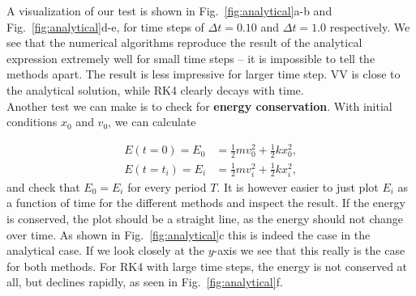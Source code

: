 \documentclass{article}
\begin{document}
\begin{multicols}{2}
A visualization of our test is shown in Fig.~\ref{fig:analytical}a-b and Fig.~\ref{fig:analytical}d-e, for time steps of $\Delta t = 0.10$ and $\Delta t = 1.0$ respectively. We see that the numerical algorithms reproduce the result of the analytical expression extremely well for small time steps -- it is impossible to tell the methods apart. The result is less impressive for larger time step. VV is close to the analytical solution, while RK4 clearly decays with time. \\

\noindent Another test we can make is to check for \textbf{energy conservation}. With initial conditions $x_0$ and $v_0$, we can calculate

\begin{equation}
	\begin{aligned}
		E(t = 0) = E_0 &= \frac{1}{2}mv_0^2 + \frac{1}{2}kx_0^2, \\
		E(t = t_i) = E_i &= \frac{1}{2}mv_i^2 + \frac{1}{2}kx_i^2,
	\end{aligned}
\end{equation}
and check that $E_0 = E_i$ for every period $T$. It is however easier to just plot $E_i$ as a function of time for the different methods and inspect the result. If the energy is conserved, the plot should be a straight line, as the energy should not change over time. As shown in Fig.~\ref{fig:analytical}c this is indeed the case in the analytical case. If we look closely at the $y$-axis we see that this really is the case for both methods. For RK4 with large time steps, the energy is not conserved at all, but declines rapidly, as seen in Fig.~\ref{fig:analytical}f. \\



\end{multicols}
\end{document}
